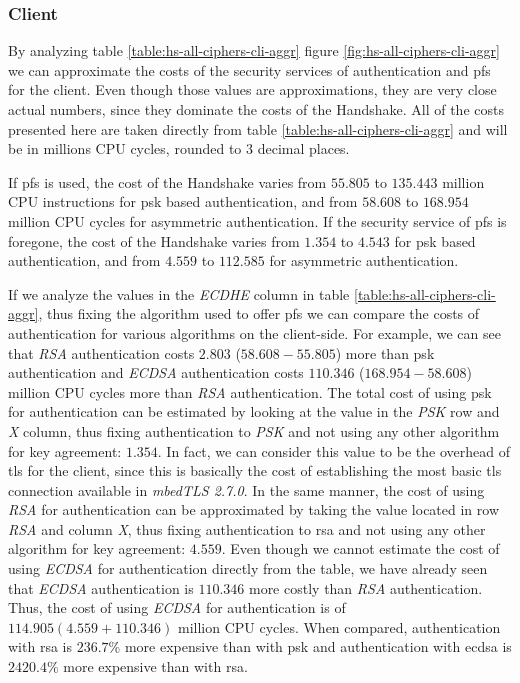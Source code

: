 \documentclass{llncs}
\begin{document}
\subsubsection{Client}

By analyzing table \ref{table:hs-all-ciphers-cli-aggr} figure \ref{fig:hs-all-ciphers-cli-aggr} we can approximate
the costs of the security services of authentication and \gls{pfs} for the client. Even though those values are approximations,
they are very close actual numbers, since they dominate the costs of the Handshake. All of the costs presented here
are taken directly from table \ref{table:hs-all-ciphers-cli-aggr} and will be in millions CPU cycles,
rounded to $3$ decimal places.

If \gls{pfs} is used, the cost of the Handshake varies from $55.805$ to $135.443$
million CPU instructions for \gls{psk} based authentication, and from $58.608$ to $168.954$ million CPU cycles for
asymmetric authentication. If the security service of \gls{pfs} is foregone, the cost
of the Handshake varies from $1.354$ to $4.543$ for \gls{psk} based authentication,
and from $4.559$ to $112.585$ for asymmetric authentication.

If we analyze the values in the \textit{ECDHE} column in table \ref{table:hs-all-ciphers-cli-aggr}, thus fixing the
algorithm used to offer \gls{pfs} we can compare the costs of authentication for various algorithms on the client-side.
For example, we can see that \textit{RSA} authentication costs $2.803$  ($58.608 - 55.805$)
more than \gls{psk} authentication and \textit{ECDSA} authentication costs $110.346$ ($168.954 - 58.608$)
million CPU cycles more than
\textit{RSA} authentication. The total cost of using \gls{psk} for authentication can be estimated by looking at the
value in the \textit{PSK} row and \textit{X} column, thus fixing authentication to \textit{PSK} and not using any other
algorithm for key agreement: $1.354$. In fact, we can consider this value to be the overhead of \gls{tls} for the client,
since this is basically the cost of establishing the most basic \gls{tls} connection available in \textit{mbedTLS 2.7.0}.
In the same manner, the cost of using \textit{RSA} for authentication can
be approximated by taking the value located in row \textit{RSA} and column \textit{X}, thus fixing authentication
to \gls{rsa} and not using any other algorithm for key agreement: $4.559$. Even though we cannot estimate the cost
of using \textit{ECDSA} for authentication directly from the table, we have already seen that \textit{ECDSA} authentication
is $110.346$ more costly than \textit{RSA} authentication. Thus, the cost of using \textit{ECDSA} for authentication
is of $114.905 (4.559+110.346)$ million CPU cycles. When compared, authentication with \gls{rsa} is
$236.7\%$ more expensive than with \gls{psk} and authentication with \gls{ecdsa} is $2420.4\%$ more
expensive than with \gls{rsa}.
\end{document}
